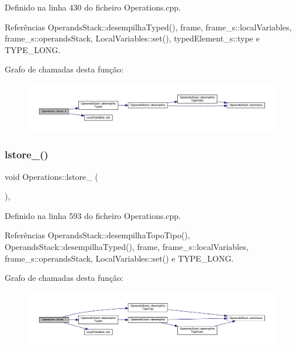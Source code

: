 Definido na linha 430 do ficheiro Operations.\+cpp.



Referências Operands\+Stack\+::desempilha\+Typed(), frame, frame\+\_\+s\+::local\+Variables, frame\+\_\+s\+::operands\+Stack, Local\+Variables\+::set(), typed\+Element\+\_\+s\+::type e T\+Y\+P\+E\+\_\+\+L\+O\+NG.

Grafo de chamadas desta função\+:
\nopagebreak
\begin{figure}[H]
\begin{center}
\leavevmode
\includegraphics[width=350pt]{classOperations_ae3c949d56a3ee685668134493595334b_cgraph}
\end{center}
\end{figure}
\mbox{\label{classOperations_aa162cef00367e3d5fb5dca12494a5793}} 
\subsubsection{\texorpdfstring{lstore\+\_()}{lstore\_1()}}
{\footnotesize\ttfamily void Operations\+::lstore\+\_ (\begin{DoxyParamCaption}{ }\end{DoxyParamCaption})\hspace{0.3cm}{\ttfamily [static]}, {\ttfamily [private]}}



Definido na linha 593 do ficheiro Operations.\+cpp.



Referências Operands\+Stack\+::desempilha\+Topo\+Tipo(), Operands\+Stack\+::desempilha\+Typed(), frame, frame\+\_\+s\+::local\+Variables, frame\+\_\+s\+::operands\+Stack, Local\+Variables\+::set() e T\+Y\+P\+E\+\_\+\+L\+O\+NG.

Grafo de chamadas desta função\+:
\nopagebreak
\begin{figure}[H]
\begin{center}
\leavevmode
\includegraphics[width=350pt]{classOperations_aa162cef00367e3d5fb5dca12494a5793_cgraph}
\end{center}
\end{figure}
\mbox{\label{classOperations_a178660c2b3ca2625c140daf867531386}} 
